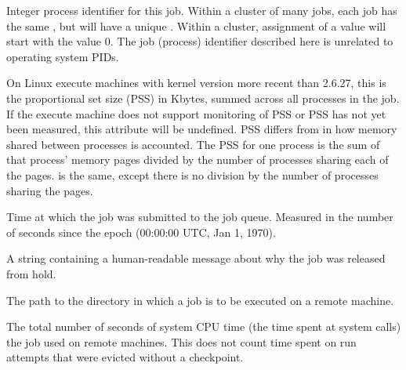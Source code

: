 \begin{description}
\item[\AdAttr{ProcId}:]  Integer process identifier for this job.
Within a cluster of many jobs,
each job has the same , but will have a unique .
Within a cluster, assignment of a  value will start
with the value 0.
The job (process) identifier described here is unrelated to operating
system PIDs.

\item[\AdAttr{ProportionalSetSizeKb}:]
On Linux execute machines with kernel version more recent than 2.6.27,
this is the proportional set size (PSS) in Kbytes,
summed across all processes in the job.
If the execute machine does not
support monitoring of PSS or PSS has not yet been measured,
this attribute will be undefined.  
PSS differs from  in how memory shared
between processes is accounted.
The PSS for one process is the sum of that process' memory pages 
divided by the number of processes sharing each of the pages.
 is the same,
except there is no division by the number of processes sharing the pages.

\item[\AdAttr{QDate}:]  Time at which the job was submitted to the job
queue.  Measured in the
number of seconds since the epoch (00:00:00 UTC, Jan 1, 1970).

\item[\AdAttr{ReleaseReason}:]     A string containing a human-readable
message about why the job was released from hold.

\item[\AdAttr{RemoteIwd}:]  The path to the directory in which
a job is to be executed on a remote machine.

\item[\AdAttr{RemoteSysCpu}:]  The total number of seconds
of system CPU time (the time spent at system calls) the job used
on remote machines.  This does not count time spent on run attempts that
were evicted without a checkpoint.


\end{description}
